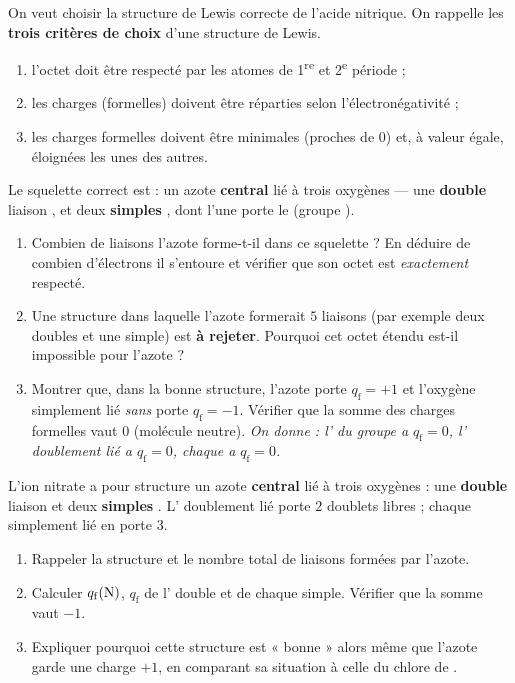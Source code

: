\documentclass[11pt,a4paper]{article}
\begin{document}
\begin{exo}
On veut choisir la structure de Lewis correcte de l'acide nitrique. On rappelle les
\textbf{trois critères de choix} d'une structure de Lewis.
\begin{enumerate}[label=\arabic*.,leftmargin=2em,itemsep=1pt]
  \item l'octet doit être respecté par les atomes de 1\textsuperscript{re} et 2\textsuperscript{e} période ;
  \item les charges (formelles) doivent être réparties selon l'électronégativité ;
  \item les charges formelles doivent être minimales (proches de $0$) et, à valeur égale, éloignées les unes des autres.
\end{enumerate}

Le squelette correct est  : un azote \textbf{central} lié à trois oxygènes — une
\textbf{double} liaison , et deux \textbf{simples} , dont l'une porte le 
(groupe ).
\begin{enumerate}[label=\alph*),leftmargin=2em,itemsep=2pt]
  \item Combien de liaisons l'azote forme-t-il dans ce squelette ? En déduire de combien d'électrons
        il s'entoure et vérifier que son octet est \emph{exactement} respecté.
  \item Une structure dans laquelle l'azote formerait $5$ liaisons (par exemple deux doubles et une
        simple) est \textbf{à rejeter}. Pourquoi cet octet étendu est-il impossible pour l'azote ?
  \item Montrer que, dans la bonne structure, l'azote porte $q_{\mathrm{f}} = +1$ et l'oxygène
        simplement lié \emph{sans}  porte $q_{\mathrm{f}} = -1$. Vérifier que la somme des
        charges formelles vaut $0$ (molécule neutre). \emph{On donne : l' du groupe 
        a $q_{\mathrm{f}} = 0$, l' doublement lié a $q_{\mathrm{f}} = 0$, chaque  a
        $q_{\mathrm{f}} = 0$.}
\end{enumerate}
\end{exo}

\begin{exo}
L'ion nitrate a pour structure un azote \textbf{central} lié à trois oxygènes : une \textbf{double}
liaison  et deux \textbf{simples} . L' doublement lié porte $2$ doublets
libres ; chaque  simplement lié en porte $3$.
\begin{enumerate}[label=\alph*),leftmargin=2em,itemsep=2pt]
  \item Rappeler la structure et le nombre total de liaisons formées par l'azote.
  \item Calculer $q_{\mathrm{f}}(\ce{N})$, $q_{\mathrm{f}}$ de l' double et de chaque 
        simple. Vérifier que la somme vaut $-1$.
  \item Expliquer pourquoi cette structure est « bonne » alors même que l'azote garde une charge
        $+1$, en comparant sa situation à celle du chlore de .
\end{enumerate}
\end{exo}
\end{document}
